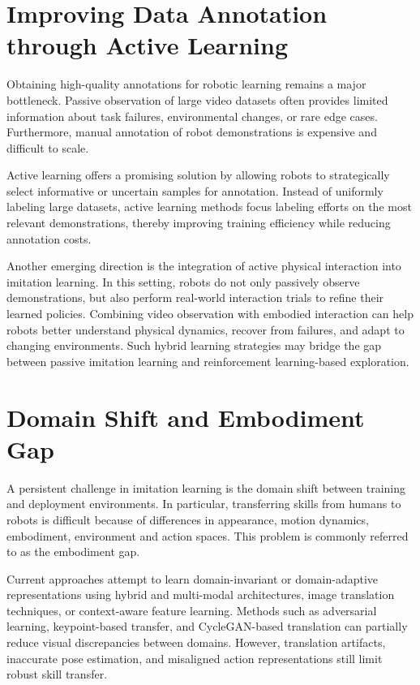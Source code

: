 \section{Improving Data Annotation through Active Learning}

Obtaining high-quality annotations for robotic learning remains a major bottleneck. Passive observation of large video datasets often provides limited information about task failures, environmental changes, or rare edge cases. Furthermore, manual annotation of robot demonstrations is expensive and difficult to scale.

Active learning offers a promising solution by allowing robots to strategically select informative or uncertain samples for annotation. Instead of uniformly labeling large datasets, active learning methods focus labeling efforts on the most relevant demonstrations, thereby improving training efficiency while reducing annotation costs.

Another emerging direction is the integration of active physical interaction into imitation learning. In this setting, robots do not only passively observe demonstrations, but also perform real-world interaction trials to refine their learned policies. Combining video observation with embodied interaction can help robots better understand physical dynamics, recover from failures, and adapt to changing environments. Such hybrid learning strategies may bridge the gap between passive imitation learning and reinforcement learning-based exploration.

\section{Domain Shift and Embodiment Gap}

A persistent challenge in imitation learning is the domain shift between training and deployment environments. In particular, transferring skills from humans to robots is difficult because of differences in appearance, motion dynamics, embodiment, environment and action spaces. This problem is commonly referred to as the embodiment gap.

Current approaches attempt to learn domain-invariant or domain-adaptive representations using hybrid and multi-modal architectures, image translation techniques, or context-aware feature learning. Methods such as adversarial learning, keypoint-based transfer, and CycleGAN-based translation can partially reduce visual discrepancies between domains. However, translation artifacts, inaccurate pose estimation, and misaligned action representations still limit robust skill transfer.

